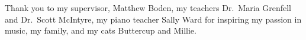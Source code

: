 \cleardoublepage{}
\begin{center}
	
	Thank you to my supervisor, Matthew Boden, my teachers Dr.\ Maria Grenfell and Dr.\ Scott McIntyre, my piano teacher Sally Ward for inspiring my passion in music, my family, and my cats Buttercup and Millie.
	
\end{center}
\cleardoublepage{}
